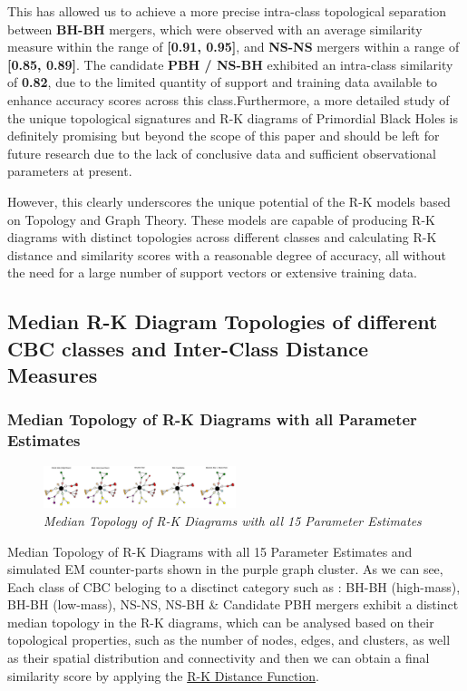 This has allowed us to achieve a more precise intra-class topological separation between \textbf{BH-BH} mergers, which were observed with an average similarity measure within the range of \textbf{[0.91, 0.95]}, and \textbf{NS-NS} mergers within a range of \textbf{[0.85, 0.89]}. The candidate \textbf{PBH / NS-BH} exhibited an intra-class similarity of \textbf{0.82}, due to the limited quantity of support and training data available to enhance accuracy scores across this class.Furthermore, a more detailed study of the unique topological signatures and R-K diagrams of Primordial Black Holes is definitely promising but beyond the scope of this paper and should be left for future research due to the lack of conclusive data and sufficient observational parameters at present.

However, this clearly underscores the unique potential of the R-K models based on Topology and Graph Theory. These models are capable of producing R-K diagrams with distinct topologies across different classes and calculating R-K distance and similarity scores with a reasonable degree of accuracy, all without the need for a large number of support vectors or extensive training data. 

\subsection {Median R-K Diagram Topologies of different CBC classes and Inter-Class Distance Measures}

\subsubsection{Median Topology of R-K Diagrams with all Parameter Estimates }
\begin{figure}[H]
 	\centering
        \includegraphics[width=0.5\textwidth]{images/Median_Topologies_All_Parameters.jpg}
	\caption{\textit{Median Topology of R-K Diagrams with all 15 Parameter Estimates}}
	\label{fig:Median_Topo_All}
\end{figure}

Median Topology of R-K Diagrams with all 15 Parameter Estimates and simulated EM counter-parts shown in the purple graph cluster. As we can see, Each class of CBC beloging to a disctinct category such as : BH-BH (high-mass), BH-BH (low-mass), NS-NS, NS-BH \& Candidate PBH mergers exhibit a distinct median topology in the R-K diagrams, which can be analysed based on their topological properties, such as the number of nodes, edges, and clusters, as well as their spatial distribution and connectivity and then we can obtain a final similarity score by applying the \hyperref[sec:rk_distance]{ R-K Distance Function}.

